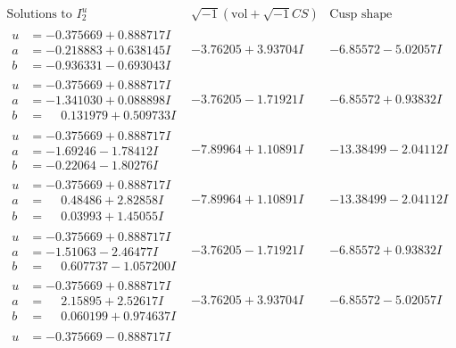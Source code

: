 \documentclass[1p]{elsarticle_modified}
\theoremstyle{definition}
\newcommand{\I}{\sqrt{-1}}
\begin{document}
$$\begin{array}{c|c|c}  
\text{Solutions to }I^u_{2}& \I (\text{vol} + \sqrt{-1}CS) & \text{Cusp shape}\\
 \hline 
\begin{aligned}
u &= -0.375669 + 0.888717 I \\
a &= -0.218883 + 0.638145 I \\
b &= -0.936331 - 0.693043 I\end{aligned}
 & -3.76205 + 3.93704 I & -6.85572 - 5.02057 I \\ \hline\begin{aligned}
u &= -0.375669 + 0.888717 I \\
a &= -1.341030 + 0.088898 I \\
b &= \phantom{-}0.131979 + 0.509733 I\end{aligned}
 & -3.76205 - 1.71921 I & -6.85572 + 0.93832 I \\ \hline\begin{aligned}
u &= -0.375669 + 0.888717 I \\
a &= -1.69246 - 1.78412 I \\
b &= -0.22064 - 1.80276 I\end{aligned}
 & -7.89964 + 1.10891 I & -13.38499 - 2.04112 I \\ \hline\begin{aligned}
u &= -0.375669 + 0.888717 I \\
a &= \phantom{-}0.48486 + 2.82858 I \\
b &= \phantom{-}0.03993 + 1.45055 I\end{aligned}
 & -7.89964 + 1.10891 I & -13.38499 - 2.04112 I \\ \hline\begin{aligned}
u &= -0.375669 + 0.888717 I \\
a &= -1.51063 - 2.46477 I \\
b &= \phantom{-}0.607737 - 1.057200 I\end{aligned}
 & -3.76205 - 1.71921 I & -6.85572 + 0.93832 I \\ \hline\begin{aligned}
u &= -0.375669 + 0.888717 I \\
a &= \phantom{-}2.15895 + 2.52617 I \\
b &= \phantom{-}0.060199 + 0.974637 I\end{aligned}
 & -3.76205 + 3.93704 I & -6.85572 - 5.02057 I \\ \hline\begin{aligned}
u &= -0.375669 - 0.888717 I \\

\end{aligned}
\end{array}$$
\end{document}
